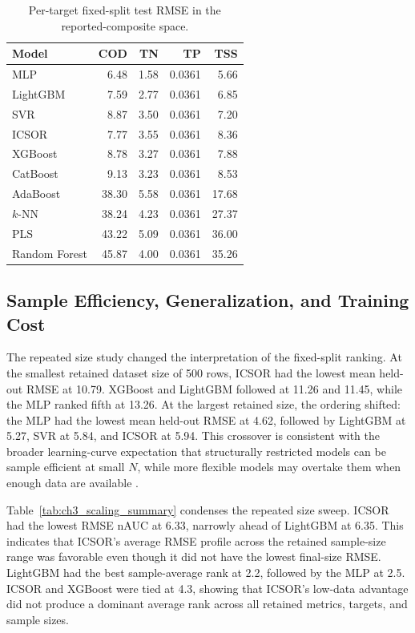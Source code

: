 \documentclass[12pt, twoside]{book}
\begin{document}
\begin{table}[htbp]
\centering
\caption{Per-target fixed-split test RMSE in the reported-composite space.}
\label{tab:ch3_per_target_rmse}
\scriptsize
\setlength{\tabcolsep}{6pt}
\begin{tabular}{lrrrr}
\toprule
Model & COD & TN & TP & TSS \\
\midrule
MLP & 6.48 & 1.58 & 0.0361 & 5.66 \\
LightGBM & 7.59 & 2.77 & 0.0361 & 6.85 \\
SVR & 8.87 & 3.50 & 0.0361 & 7.20 \\
ICSOR & 7.77 & 3.55 & 0.0361 & 8.36 \\
XGBoost & 8.78 & 3.27 & 0.0361 & 7.88 \\
CatBoost & 9.13 & 3.23 & 0.0361 & 8.53 \\
AdaBoost & 38.30 & 5.58 & 0.0361 & 17.68 \\
\(k\)-NN & 38.24 & 4.23 & 0.0361 & 27.37 \\
PLS & 43.22 & 5.09 & 0.0361 & 36.00 \\
Random Forest & 45.87 & 4.00 & 0.0361 & 35.26 \\
\bottomrule
\end{tabular}
\end{table}

\subsection{Sample Efficiency, Generalization, and Training Cost}

The repeated size study changed the interpretation of the fixed-split ranking. At the smallest retained
dataset size of 500 rows, ICSOR had the lowest mean held-out RMSE at 10.79. XGBoost and LightGBM followed at
11.26 and 11.45, while the MLP ranked fifth at 13.26. At the largest retained size, the ordering shifted:
the MLP had the lowest mean held-out RMSE at 4.62, followed by LightGBM at 5.27, SVR at 5.84, and ICSOR at
5.94. This crossover is consistent with the broader learning-curve expectation that structurally restricted
models can be sample efficient at small \(N\), while more flexible models may overtake them when enough data
are available \citep{VieringLoog2023,Shen2023}.

Table~\ref{tab:ch3_scaling_summary} condenses the repeated size sweep. ICSOR had the lowest RMSE nAUC at
6.33, narrowly ahead of LightGBM at 6.35. This indicates that ICSOR's average RMSE profile across the retained
sample-size range was favorable even though it did not have the lowest final-size RMSE. LightGBM had the best
sample-average rank at 2.2, followed by the MLP at 2.5. ICSOR and XGBoost were tied at 4.3, showing that
ICSOR's low-data advantage did not produce a dominant average rank across all retained metrics, targets, and
sample sizes.
\end{document}
